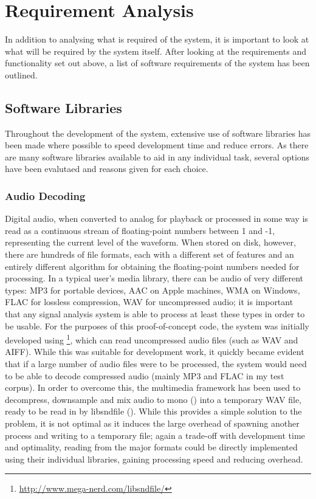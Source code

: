 {\section{Requirement Analysis}
In addition to analysing what is required of the system, it is important to look at what will be required by the system itself. After looking at the requirements and functionality set out above, a list of software requirements of the system has been outlined.
\subsection{Software Libraries}
Throughout the development of the system, extensive use of software libraries has been made where possible to speed development time and reduce errors. As there are many software libraries available to aid in any individual task, several options have been evalutaed and reasons given for each choice.
\subsubsection{Audio Decoding}
Digital audio, when converted to analog for playback or processed in some way is read as a continuous stream of floating-point numbers between 1 and -1, representing the current level of the waveform. When stored on disk, however, there are hundreds of file formats, each with a different set of features and an entirely different algorithm for obtaining the floating-point numbers needed for processing. In a typical user's media library, there can be audio of very different types: MP3 for portable devices, AAC on Apple machines, WMA on Windows, FLAC for lossless compression, WAV for uncompressed audio; it is important that any signal analysis system is able to process at least these types in order to be usable. For the purposes of this proof-of-concept code, the system was initially developed using \footnote{\url{http://www.mega-nerd.com/libsndfile/}}, which can read uncompressed audio files (such as WAV and AIFF). While this was suitable for development work, it quickly became evident that if a large number of audio files were to be processed, the system would need to be able to decode compressed audio (mainly MP3 and FLAC in my test corpus). In order to overcome this, the  multimedia framework has been used to decompress, downsample and mix audio to mono () into a temporary WAV file, ready to be read in by libsndfile (). While this provides a simple solution to the problem, it is not optimal as it induces the large overhead of spawning another process and writing to a temporary file; again a trade-off with development time and optimality, reading from the major formats could be directly implemented using their individual libraries, gaining processing speed and reducing overhead.
}
